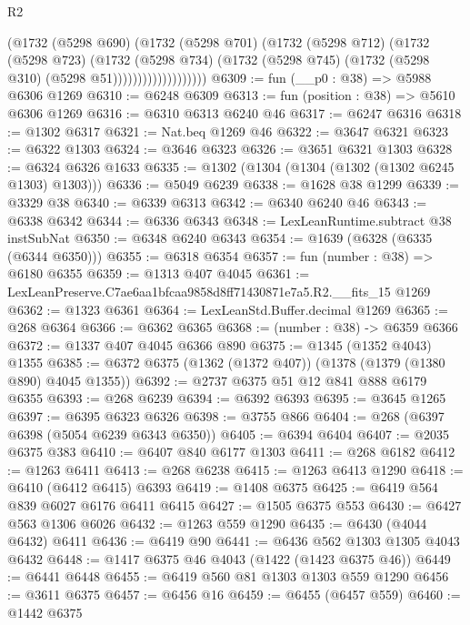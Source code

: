 \begin{lexlean}{R2}
\begin{coremodule}
                          (@1732
                            (@5298 @690)
                            (@1732
                              (@5298 @701)
                              (@1732
                                (@5298 @712)
                                (@1732
                                  (@5298 @723)
                                  (@1732
                                    (@5298 @734)
                                    (@1732
                                      (@5298 @745)
                                      (@1732 (@5298 @310) (@5298 @51)))))))))))))))))))
@6309 := fun (__p0 : @38) => @5988 @6306 @1269
@6310 := @6248 @6309
@6313 := fun (position : @38) => @5610 @6306 @1269
@6316 := @6310 @6313 @6240 @46
@6317 := @6247 @6316
@6318 := @1302 @6317
@6321 := Nat.beq @1269 @46
@6322 := @3647 @6321
@6323 := @6322 @1303
@6324 := @3646 @6323
@6326 := @3651 @6321 @1303
@6328 := @6324 @6326 @1633
@6335 := @1302 (@1304 (@1304 (@1302 (@1302 @6245 @1303) @1303)))
@6336 := @5049 @6239
@6338 := @1628 @38 @1299
@6339 := @3329 @38
@6340 := @6339 @6313
@6342 := @6340 @6240 @46
@6343 := @6338 @6342
@6344 := @6336 @6343
@6348 := LexLeanRuntime.subtract @38 instSubNat
@6350 := @6348 @6240 @6343
@6354 := @1639 (@6328 (@6335 (@6344 @6350)))
@6355 := @6318 @6354
@6357 := fun (number : @38) => @6180 @6355
@6359 := @1313 @407 @4045
@6361 := LexLeanPreserve.C7ae6aa1bfcaa9858d8ff71430871e7a5.R2.__fits_15 @1269
@6362 := @1323 @6361
@6364 := LexLeanStd.Buffer.decimal @1269
@6365 := @268 @6364
@6366 := @6362 @6365
@6368 := (number : @38) -> @6359 @6366
@6372 := @1337 @407 @4045 @6366 @890
@6375 := @1345 (@1352 @4043) @1355
@6385 := @6372 @6375 (@1362 (@1372 @407)) (@1378 (@1379 (@1380 @890) @4045 @1355))
@6392 := @2737 @6375 @51 @12 @841 @888 @6179 @6355
@6393 := @268 @6239
@6394 := @6392 @6393
@6395 := @3645 @1265
@6397 := @6395 @6323 @6326
@6398 := @3755 @866
@6404 := @268 (@6397 @6398 (@5054 @6239 @6343 @6350))
@6405 := @6394 @6404
@6407 := @2035 @6375 @383
@6410 := @6407 @840 @6177 @1303
@6411 := @268 @6182
@6412 := @1263 @6411
@6413 := @268 @6238
@6415 := @1263 @6413 @1290
@6418 := @6410 (@6412 @6415) @6393
@6419 := @1408 @6375
@6425 := @6419 @564 @839 @6027 @6176 @6411 @6415
@6427 := @1505 @6375 @553
@6430 := @6427 @563 @1306 @6026
@6432 := @1263 @559 @1290
@6435 := @6430 (@4044 @6432) @6411
@6436 := @6419 @90
@6441 := @6436 @562 @1303 @1305 @4043 @6432
@6448 := @1417 @6375 @46 @4043 (@1422 (@1423 @6375 @46))
@6449 := @6441 @6448
@6455 := @6419 @560 @81 @1303 @1303 @559 @1290
@6456 := @3611 @6375
@6457 := @6456 @16
@6459 := @6455 (@6457 @559)
@6460 := @1442 @6375

\end{coremodule}
\end{lexlean}
